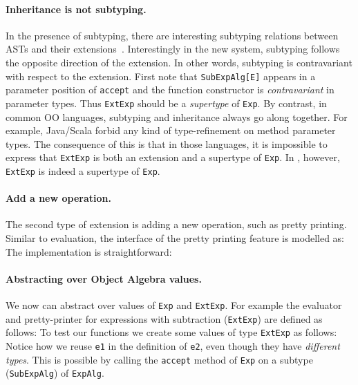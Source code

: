 \paragraph{Inheritance is not subtyping.} In the presence of subtyping, there
are interesting subtyping relations between ASTs and their
extensions~\cite{oliveira09modular}. Interestingly in the new system, subtyping
follows the opposite direction of the extension. In other words, subtyping is
contravariant with respect to the extension. First note that
\lstinline{SubExpAlg[E]} appears in a parameter position of \lstinline{accept}
and the function constructor is \textit{contravariant} in parameter types. Thus
\lstinline{ExtExp} should be a \textit{supertype} of \lstinline{Exp}. By
contrast, in common OO languages, subtyping and inheritance always go along
together. For example, Java/Scala forbid any kind of type-refinement on method
parameter types. The consequence of this is that in those languages, it is
impossible to express that \lstinline{ExtExp} is both an extension and a
supertype of \lstinline{Exp}. In \name, however, \lstinline{ExtExp} is indeed a supertype
of \lstinline{Exp}.

\paragraph{Add a new operation.} The second type of extension is adding a new
operation, such as pretty printing. Similar to evaluation, the interface of the
pretty printing feature is modelled as:
The implementation is straightforward:

\paragraph{Abstracting over Object Algebra values.} We now can abstract over
values of \lstinline{Exp} and \lstinline{ExtExp}. For example the evaluator and
pretty-printer for expressions with subtraction (\lstinline{ExtExp}) are defined
as follows:
To test our functions we create some values of type \lstinline{ExtExp} as
follows:
Notice how we reuse \lstinline{e1} in the definition of
\lstinline{e2}, even though they have \emph{different types}. This is
possible by calling the \lstinline{accept}
method of \lstinline{Exp} on a subtype (\lstinline{SubExpAlg})
of \lstinline{ExpAlg}.

